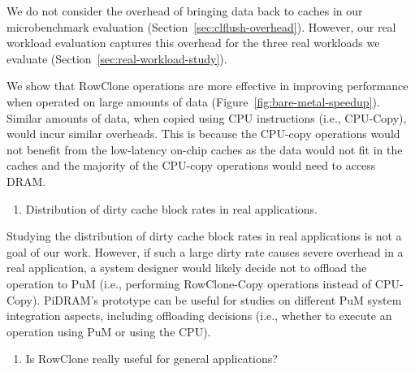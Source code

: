 We do not consider the overhead of bringing data back to caches in our microbenchmark evaluation (Section~\ref{sec:clflush-overhead}). However, our real workload evaluation captures this overhead for the three real workloads we evaluate (Section~\ref{sec:real-workload-study}).

We show that RowClone operations are more effective in improving performance when operated on large amounts of data (Figure~\ref{fig:bare-metal-speedup}). Similar amounts of data, when copied using CPU instructions (i.e., CPU-Copy), would incur similar overheads. This is because the CPU-copy operations would not benefit from the low-latency on-chip caches as the data would not fit in the caches and the majority of the CPU-copy operations would need to access DRAM.


\bigbreak
\begin{tcolorbox}
    \begin{enumerate}[label=R1/\arabic*]
       \addtocounter{enumi}{3}
        \item \label{q:r1q4} Distribution of dirty cache block rates in real applications.
    \end{enumerate}
\end{tcolorbox} 

Studying the distribution of dirty cache block rates in real applications is not a goal of our work. However, if such a large dirty rate causes severe overhead in a real application, a system designer would likely decide not to offload the operation to PuM (i.e., performing RowClone-Copy operations instead of CPU-Copy). PiDRAM’s prototype can be useful for studies on different PuM system integration aspects, including offloading decisions (i.e., whether to execute an operation using PuM or using the CPU).

\bigbreak
\begin{tcolorbox}
    \begin{enumerate}[label=R1/\arabic*]
        \addtocounter{enumi}{4}
        \item \label{q:r1q5} Is RowClone really useful for general applications? 
    \end{enumerate}
\end{tcolorbox} 

